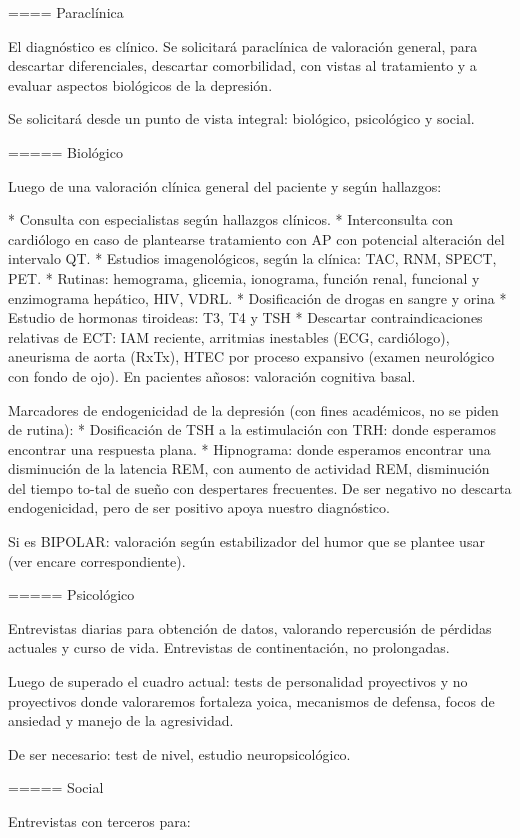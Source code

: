 ==== Paraclínica

El diagnóstico es clínico. Se solicitará paraclínica de valoración general, para descartar diferenciales, descartar comorbilidad, con vistas al tratamiento y a evaluar aspectos biológicos de la depresión.

Se solicitará desde un punto de vista integral: biológico, psicológico y social.

===== Biológico

Luego de una valoración clínica general del paciente y según hallazgos:

* Consulta con especialistas según hallazgos clínicos.
* Interconsulta con cardiólogo en caso de plantearse tratamiento con AP con potencial alteración del intervalo QT.
* Estudios imagenológicos, según la clínica: TAC, RNM, SPECT, PET.
* Rutinas: hemograma, glicemia, ionograma, función renal, funcional y enzimograma hepático, HIV, VDRL.
* Dosificación de drogas en sangre y orina
* Estudio de hormonas tiroideas: T3, T4 y TSH
* Descartar contraindicaciones relativas de ECT: IAM reciente, arritmias inestables (ECG, cardiólogo), aneurisma de aorta (RxTx), HTEC por proceso expansivo (examen neurológico con fondo de ojo). En pacientes añosos: valoración cognitiva basal.

Marcadores de endogenicidad de la depresión (con fines académicos, no se piden de rutina):
* Dosificación de TSH a la estimulación con TRH: donde esperamos encontrar una respuesta plana.
* Hipnograma: donde esperamos encontrar una disminución de la latencia REM, con aumento de actividad REM, disminución del tiempo to-tal de sueño con despertares frecuentes. De ser negativo no descarta endogenicidad, pero de ser positivo apoya nuestro diagnóstico.

Si es BIPOLAR: valoración según estabilizador del humor que se plantee usar (ver encare correspondiente).

===== Psicológico

Entrevistas diarias para obtención de datos, valorando repercusión de pérdidas actuales y curso de vida. Entrevistas de continentación, no prolongadas.

Luego de superado el cuadro actual: tests de personalidad proyectivos y no proyectivos donde valoraremos fortaleza yoica, mecanismos de defensa, focos de ansiedad y manejo de la agresividad.

De ser necesario: test de nivel, estudio neuropsicológico.

===== Social

Entrevistas con terceros para:

